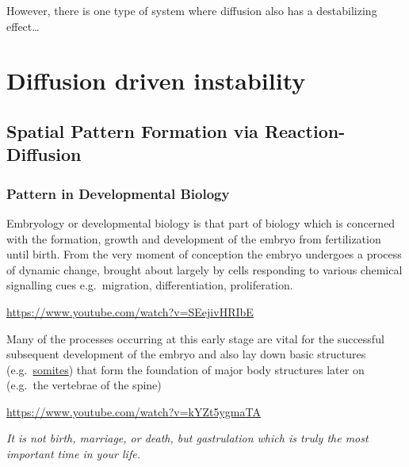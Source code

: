 \documentclass[
  letterpaper,
  DIV=11,
  numbers=noendperiod]{scrreprt}
\theoremstyle{plain}
\theoremstyle{definition}
\theoremstyle{plain}
\theoremstyle{remark}
\begin{document}
However, there is one type of system where diffusion also has a
destabilizing effect\ldots{}

\hypertarget{diffusion-driven-instability}{%
\chapter{Diffusion driven
instability}\label{diffusion-driven-instability}}

\hypertarget{spatial-pattern-formation-via-reaction-diffusion}{%
\section{Spatial Pattern Formation via
Reaction-Diffusion}\label{spatial-pattern-formation-via-reaction-diffusion}}

\hypertarget{pattern-in-developmental-biology}{%
\subsection{Pattern in Developmental
Biology}\label{pattern-in-developmental-biology}}

Embryology or developmental biology is that part of biology which is
concerned with the formation, growth and development of the embryo from
fertilization until birth. From the very moment of conception the embryo
undergoes a process of dynamic change, brought about largely by cells
responding to various chemical signalling cues e.g.~migration,
differentiation, proliferation.

\url{https://www.youtube.com/watch?v=SEejivHRIbE}

Many of the processes occurring at this early stage are vital for the
successful subsequent development of the embryo and also lay down basic
structures (e.g.~\href{https://en.wikipedia.org/wiki/Somite}{somites})
that form the foundation of major body structures later on (e.g.~the
vertebrae of the spine)

\url{https://www.youtube.com/watch?v=kYZt5ygmaTA}

\begin{tcolorbox}[enhanced jigsaw, colback=white, colframe=quarto-callout-note-color-frame, toprule=.15mm, bottomrule=.15mm, left=2mm, leftrule=.75mm, bottomtitle=1mm, opacitybacktitle=0.6, breakable, rightrule=.15mm, titlerule=0mm, colbacktitle=quarto-callout-note-color!10!white, title=\textcolor{quarto-callout-note-color}{\faInfo}\hspace{0.5em}{Professor Lewis Wolpert}, arc=.35mm, coltitle=black, toptitle=1mm, opacityback=0]

\emph{It is not birth, marriage, or death, but gastrulation which is
truly the most important time in your life.}

\end{tcolorbox}
\end{document}
